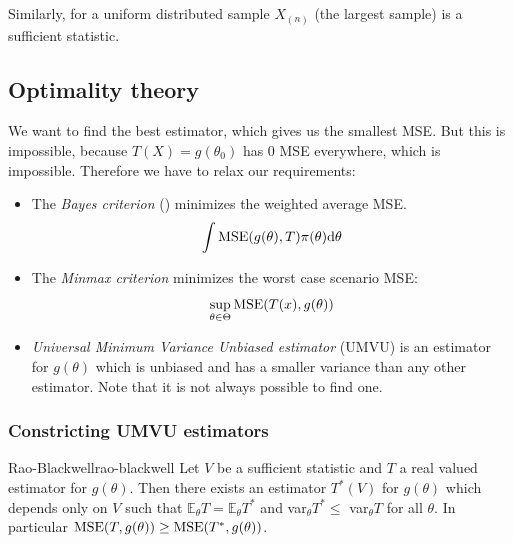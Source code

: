 \documentclass[12pt]{extarticle}
\newcommand{\E}{\mathds{E}}
\begin{document}
Similarly, for a uniform distributed sample $X_{(n)}$ (the largest sample) is a sufficient statistic.

\subsection{Optimality theory}

We want to find the best estimator, which gives us the smallest MSE.
But this is impossible, because $T(X) = g(\theta_0)$ has 0 MSE everywhere, which is impossible.
Therefore we have to relax our requirements:
\begin{itemize}
    \item The \emph{Bayes criterion} () minimizes the weighted average MSE.
          \begin{equation}
              \int \MSE(g(\theta), T) \pi(\theta) \dd \theta
          \end{equation}
    \item The \emph{Minmax criterion} minimizes the worst case scenario MSE:
          \begin{equation}
              \sup_{\theta \in \Theta} \MSE(T(x), g(\theta))
          \end{equation}
    \item \emph{Universal Minimum Variance Unbiased estimator} (UMVU) is an estimator for $g(\theta)$
          which is unbiased and has a smaller variance than any other estimator.
          Note that it is not always possible to find one.
\end{itemize}

\subsubsection{Constricting UMVU estimators}

\begin{theorem}{Rao-Blackwell}{rao-blackwell}
    Let $V$ be a sufficient statistic and $T$ a real valued estimator for $g(\theta)$.
    Then there exists an estimator $T^*(V)$ for $g(\theta)$ which depends only on $V$ such that
    $\E_\theta T = \E_\theta T^*$ and var$_\theta T^* \leq$ var$_\theta T$ for all $\theta$.
    In particular $\MSE(T, g(\theta)) \geq \MSE(T^*, g(\theta))$.
\end{theorem}
\end{document}
